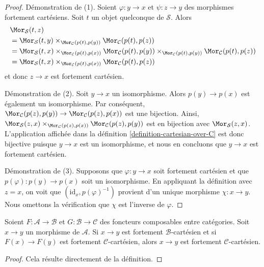 \begin{proof}
Démonstration de (1). Soient $\varphi : y \to x$ et
$\psi : z \to y$ des morphismes fortement cartésiens. Soit $t$ un objet
quelconque de $\mathcal{S}$. Alors
\begin{align*}
& \Mor_\mathcal{S}(t, z) \\
& =
\Mor_\mathcal{S}(t, y)
\times_{\Mor_\mathcal{C}(p(t), p(y))}
\Mor_\mathcal{C}(p(t), p(z)) \\
& =
\Mor_\mathcal{S}(t, x)
\times_{\Mor_\mathcal{C}(p(t), p(x))}
\Mor_\mathcal{C}(p(t), p(y))
\times_{\Mor_\mathcal{C}(p(t), p(y))}
\Mor_\mathcal{C}(p(t), p(z)) \\
& =
\Mor_\mathcal{S}(t, x)
\times_{\Mor_\mathcal{C}(p(t), p(x))}
\Mor_\mathcal{C}(p(t), p(z))
\end{align*}
et donc $z \to x$ est fortement cartésien.

\medskip\noindent
Démonstration de (2). Soit $y \to x$ un isomorphisme. Alors
$p(y) \to p(x)$ est également un isomorphisme. Par conséquent,
$\Mor_\mathcal{C}(p(z), p(y)) \to
\Mor_\mathcal{C}(p(z), p(x))$
est une bijection. Ainsi,
$\Mor_\mathcal{S}(z, x)
\times_{\Mor_\mathcal{C}(p(z), p(x))}
\Mor_\mathcal{C}(p(z), p(y))$ est en bijection avec
$\Mor_\mathcal{S}(z, x)$.
L'application affichée dans la
définition \ref{definition-cartesian-over-C}
est donc bijective puisque $y \to x$ est un isomorphisme, et nous en
concluons que $y \to x$ est fortement cartésien.

\medskip\noindent
Démonstration de (3). Supposons que $\varphi : y \to x$ soit fortement
cartésien et que $p(\varphi) : p(y) \to p(x)$ soit un isomorphisme.
En appliquant la définition avec $z = x$, on voit que
$(\text{id}_x, p(\varphi)^{-1})$ provient d'un unique morphisme
$\chi : x \to y$. Nous omettons la vérification que $\chi$ est l'inverse
de $\varphi$.
\end{proof}

\begin{lemma}
\label{lemma-cartesian-over-cartesian}
Soient $F : \mathcal{A} \to \mathcal{B}$ et
$G : \mathcal{B} \to \mathcal{C}$ des foncteurs composables entre
catégories. Soit $x \to y$ un morphisme de $\mathcal{A}$. Si
$x \to y$ est fortement $\mathcal{B}$-cartésien et si
$F(x) \to F(y)$ est fortement $\mathcal{C}$-cartésien, alors
$x \to y$ est fortement $\mathcal{C}$-cartésien.
\end{lemma}

\begin{proof}
Cela résulte directement de la définition.
\end{proof}

